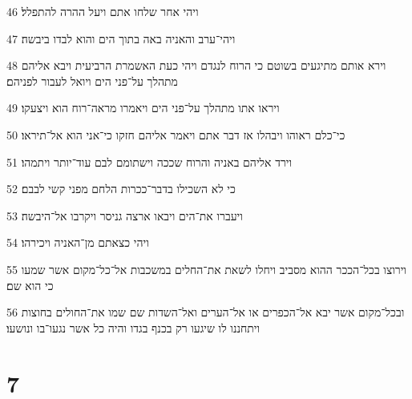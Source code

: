 \par 46 ויהי אחר שלחו אתם ויעל ההרה להתפלל׃
\par 47 ויהי־ערב והאניה באה בתוך הים והוא לבדו ביבשה׃
\par 48 וירא אותם מתיגעים בשוטם כי הרוח לנגדם ויהי כעת האשמרת הרביעית ויבא אליהם מתהלך על־פני הים ויואל לעבור לפניהם׃
\par 49 ויראו אתו מתהלך על־פני הים ויאמרו מראה־רוח הוא ויצעקו׃
\par 50 כי־כלם ראוהו ויבהלו אז דבר אתם ויאמר אליהם חזקו כי־אני הוא אל־תיראו׃
\par 51 וירד אליהם באניה והרוח שככה וישתומם לבם עוד־יותר ויתמהו׃
\par 52 כי לא השכילו בדבר־ככרות הלחם מפני קשי לבבם׃
\par 53 ויעברו את־הים ויבאו ארצה גניסר ויקרבו אל־היבשה׃
\par 54 ויהי כצאתם מן־האניה ויכירהו׃
\par 55 וירוצו בכל־הככר ההוא מסביב ויחלו לשאת את־החלים במשכבות אל־כל־מקום אשר שמעו כי הוא שם׃
\par 56 ובכל־מקום אשר יבא אל־הכפרים או אל־הערים ואל־השדות שם שמו את־החולים בחוצות ויתחננו לו שיגעו רק בכנף בגדו והיה כל אשר נגעו־בו ונושעו׃

\chapter{7}


